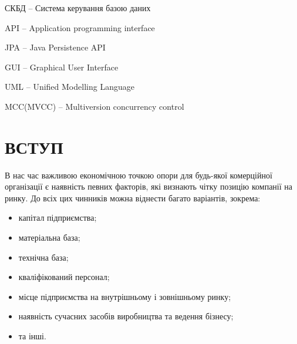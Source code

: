 \par СКБД -- Система керування базою даних
\par API -- Application programming interface
\par JPA -- Java Persistence API
\par GUI -- Graphical User Interface
\par UML -- Unified Modelling Language
\par MCC(MVCC) -- Multiversion concurrency control


\section*{ВСТУП}
В нас час важливою економічною точкою опори для будь-якої комерційної організації є наявність певних факторів, які визнають чітку позицію компанії на ринку. До всіх цих чинників можна віднести багато варіантів, зокрема:
\begin{itemize}
\item капітал підприємства;
\item матеріальна база;
\item технічна база;
\item кваліфікований персонал;
\item місце підприємства на внутрішньому і зовнішньому ринку;
\item наявність сучасних засобів виробництва та ведення бізнесу;
\item та інші.
\end{itemize}

